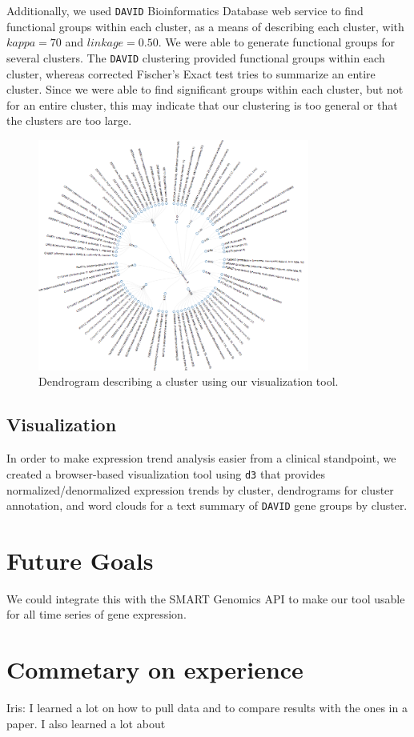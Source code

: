 \documentclass[aps,prd,final,onecolumn,a4paper,10pt]{revtex4}
\begin{document}
Additionally, we used \verb!DAVID! Bioinformatics Database web service to find functional groups within each cluster, as a means of describing each cluster, with $kappa=70$ and $linkage = 0.50$. We were able to generate functional groups for several clusters.
The \verb!DAVID! clustering provided functional groups within each cluster, whereas corrected Fischer's Exact test tries to summarize an entire cluster. Since we were able to find significant groups within each cluster, but not for an entire cluster, this may indicate that our clustering is too general or that the clusters are too large.

\begin{figure}[h]
\includegraphics[height=3in]{dendrogram.png}
\caption{Dendrogram describing a cluster using our visualization tool.}
\label{fig:dendrogram}
\end{figure}



\subsection{Visualization}
In order to make expression trend analysis easier from a clinical standpoint, we created a browser-based visualization tool using \verb!d3! that provides normalized/denormalized expression trends by cluster, dendrograms for cluster annotation, and word clouds for a text summary of \verb!DAVID! gene groups by cluster.
\section{Future Goals}


We could integrate this with the SMART Genomics API to make our tool usable for all time series of gene expression.
\section{Commetary on experience}
Iris: I learned a lot on how to pull data and to compare results with the ones in a paper. I also learned a lot about
\end{document}

